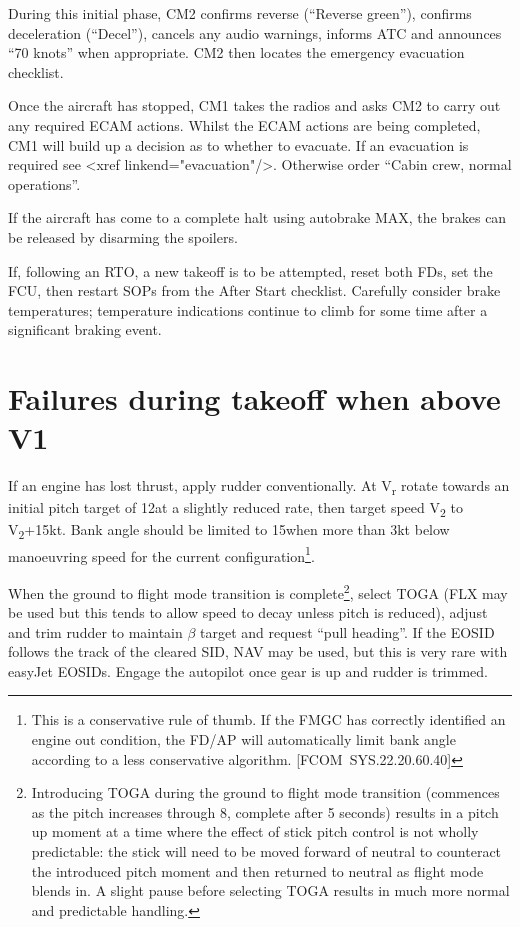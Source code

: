 \documentclass[a5paper,11pt,twoside]{book}
\newcommand{\multicite}[1]{
  \nopagebreak
  \noindent{\footnotesize\color{blue}{[ #1 ]}}
}
\newcommand{\V}[1]{V\textsubscript{#1}}
\begin{document}
During this initial phase, CM2 confirms reverse (“Reverse green”), confirms
deceleration (“Decel”), cancels any audio warnings, informs ATC and announces
“70 knots” when appropriate. CM2 then locates the emergency evacuation
checklist.

Once the aircraft has stopped, CM1 takes the radios and asks CM2 to carry out
any required ECAM actions. Whilst the ECAM actions are being completed, CM1 will
build up a decision as to whether to evacuate. If an evacuation is required see
<xref linkend="evacuation"/>. Otherwise order “Cabin crew, normal operations”.

If the aircraft has come to a complete halt using autobrake MAX, the brakes can
be released by disarming the spoilers.

If, following an RTO, a new takeoff is to be attempted, reset both FDs, set the
FCU, then restart SOPs from the After Start checklist. Carefully consider brake
temperatures; temperature indications continue to climb for some time after a
significant braking event.

\multicite{EOMB~3.10, FCTM~PRO.AEP.MISC}


\section{Failures during takeoff when above V1}

If an engine has lost thrust, apply rudder conventionally. At V\textsubscript{r}
rotate towards an initial pitch target of 12\textonehalf\textdegree{ }at a
slightly reduced rate, then target speed \V{2} to \V{2}+15kt. Bank angle should
be limited to 15\textdegree{ }when more than 3kt below manoeuvring speed for
the current configuration\footnote{This is a conservative rule of thumb. If the
FMGC has correctly identified an engine out condition, the FD/AP will
automatically limit bank angle according to a less conservative
algorithm. [FCOM~SYS.22.20.60.40]}.

When the ground to flight mode transition is complete\footnote{Introducing TOGA
during the ground to flight mode transition (commences as the pitch increases
through 8\textdegree{ }, complete after 5 seconds) results in a pitch up moment at a time
where the effect of stick pitch control is not wholly predictable: the stick
will need to be moved forward of neutral to counteract the introduced pitch
moment and then returned to neutral as flight mode blends in. A slight pause
before selecting TOGA results in much more normal and predictable handling.},
select TOGA (FLX may be used but this tends to allow speed to decay unless pitch
is reduced), adjust and trim rudder to maintain $\beta$ target and request “pull
heading”. If the EOSID follows the track of the cleared SID, NAV may be used,
but this is very rare with easyJet EOSIDs.  Engage the autopilot once gear is up
and rudder is trimmed.
\end{document}
